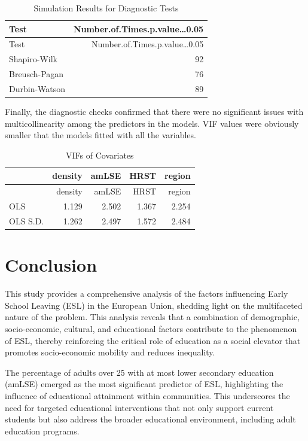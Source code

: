 \documentclass[
  letterpaper,
  DIV=11,
  numbers=noendperiod,
  abstract]{scrartcl}
\begin{document}
\begin{longtable}[]{@{}lr@{}}
\caption{Simulation Results for Diagnostic Tests}\tabularnewline
\toprule\noalign{}
Test & Number.of.Times.p.value\ldots0.05 \\
\midrule\noalign{}
\endfirsthead
\toprule\noalign{}
Test & Number.of.Times.p.value\ldots0.05 \\
\midrule\noalign{}
\endhead
\bottomrule\noalign{}
\endlastfoot
Shapiro-Wilk & 92 \\
Breusch-Pagan & 76 \\
Durbin-Watson & 89 \\
\end{longtable}

Finally, the diagnostic checks confirmed that there were no significant
issues with multicollinearity among the predictors in the models. VIF
values were obviously smaller that the models fitted with all the
variables.

\begin{longtable}[]{@{}lrrrr@{}}
\caption{VIFs of Covariates}\tabularnewline
\toprule\noalign{}
& density & amLSE & HRST & region \\
\midrule\noalign{}
\endfirsthead
\toprule\noalign{}
& density & amLSE & HRST & region \\
\midrule\noalign{}
\endhead
\bottomrule\noalign{}
\endlastfoot
OLS & 1.129 & 2.502 & 1.367 & 2.254 \\
OLS S.D. & 1.262 & 2.497 & 1.572 & 2.484 \\
\end{longtable}

\section{Conclusion}\label{conclusion}

This study provides a comprehensive analysis of the factors influencing
Early School Leaving (ESL) in the European Union, shedding light on the
multifaceted nature of the problem. This analysis reveals that a
combination of demographic, socio-economic, cultural, and educational
factors contribute to the phenomenon of ESL, thereby reinforcing the
critical role of education as a social elevator that promotes
socio-economic mobility and reduces inequality.

The percentage of adults over 25 with at most lower secondary education
(amLSE) emerged as the most significant predictor of ESL, highlighting
the influence of educational attainment within communities. This
underscores the need for targeted educational interventions that not
only support current students but also address the broader educational
environment, including adult education programs.
\end{document}
